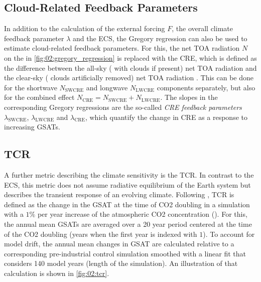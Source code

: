 \subsection{Cloud-Related Feedback Parameters}
\label{subsec:02:cloud_feedback_parameters}

In addition to the calculation of the external forcing $F$, the overall climate
feedback parameter $\lambda$ and the \ac{ECS}, the Gregory regression can also
be used to estimate cloud-related feedback parameters. For this, the net
\ac{TOA} radiation $N$ on the \yaxis{} in \cref{fig:02:gregory_regression} is
replaced with the \ac{CRE}, which is defined as the difference between the
all-sky (\ie{} with clouds if present) net \ac{TOA} radiation and the clear-sky
(\ie{} clouds artificially removed) net \ac{TOA} radiation
\autocite{Andrews2012}. This can be done for the shortwave $N_\text{SWCRE}$ and
longwave $N_\text{LWCRE}$ components separately, but also for the combined
effect $N_\text{CRE} = N_\text{SWCRE} + N_\text{LWCRE}$. The slopes in the
corresponding Gregory regressions are the so-called \emph{\ac{CRE} feedback
  parameters} $\lambda_\text{SWCRE}$, $\lambda_\text{LWCRE}$ and
$\lambda_\text{CRE}$, which quantify the change in \ac{CRE} as a response to
increasing \acp{GSAT}.


\subsection{\acl{TCR}}
\label{subsec:02:tcr}

A further metric describing the climate sensitivity is the \ac{TCR}. In
contrast to the \ac{ECS}, this metric does not assume radiative equilibrium of
the Earth system but describes the transient response of an evolving climate.
Following \textcite{Bindoff2013}, \ac{TCR} is defined as the change in the
\ac{GSAT} at the time of \ac{CO2} doubling in a simulation with a $1 \unit{\%}$
per year increase of the atmospheric \ac{CO2} concentration (\onepctcotwo{}).
For this, the annual mean \acp{GSAT} are averaged over a 20 year period
centered at the time of the \ac{CO2} doubling (years  when the
first year is indexed with $1$). To account for model drift, the annual mean
changes in \ac{GSAT} are calculated relative to a corresponding pre-industrial
control simulation smoothed with a linear fit that considers 140 model years
(length of the \onepctcotwo{} simulation). An illustration of that calculation
is shown in \cref{fig:02:tcr}.

